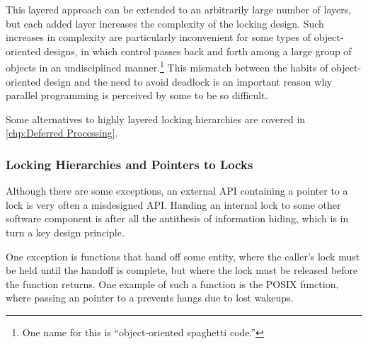 This layered approach can be extended to an arbitrarily large number of layers,
but each added layer increases the complexity of the locking design.
Such increases in complexity are particularly inconvenient for some
types of object-oriented designs, in which control passes back and forth
among a large group of objects in an undisciplined manner.\footnote{
	One name for this is ``object-oriented spaghetti code.''}
This mismatch between the habits of object-oriented design and the
need to avoid deadlock is an important reason why parallel programming
is perceived by some to be so difficult.

Some alternatives to highly layered locking hierarchies are covered in
\cref{chp:Deferred Processing}.

\subsubsection{Locking Hierarchies and Pointers to Locks}
\label{sec:locking:Locking Hierarchies and Pointers to Locks}

Although there are some exceptions, an external API containing a pointer
to a lock is very often a misdesigned API\@.
Handing an internal lock to some other software component is after all
the antithesis of information hiding, which is in turn a key design
principle.

\QuickQuizEnd

One exception is functions that hand off some entity,
where the caller's lock must be held until the handoff is complete,
but where the lock must be released before the function returns.
One example of such a function is the POSIX 
function, where passing an pointer to a 
prevents hangs due to lost wakeups.

\QuickQuizEnd

